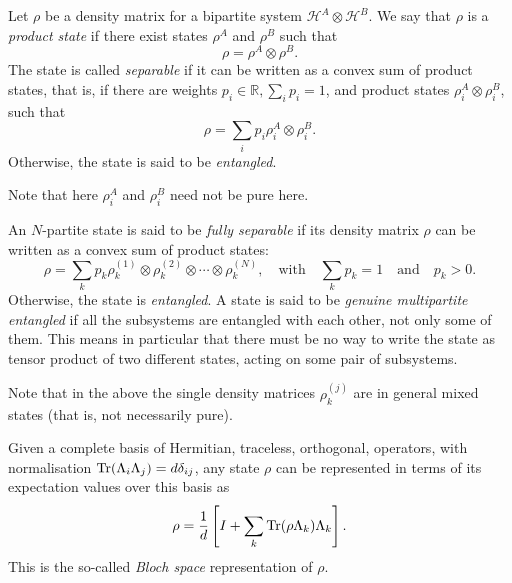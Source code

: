 \documentclass[12pt]{report}
\newcommand{\RR}{\mathbb{R}}
\begin{document}
\begin{defn}
	Let $\rho$ be a density matrix for a bipartite system $\mathcal H^A \otimes \mathcal H^B$.
	We say that $\rho$ is a \emph{product state} if there exist states $\rho^A$ and $\rho^B$ such that
	\begin{equation}
		\rho = \rho^A \otimes \rho^B.
	\end{equation}
	The state is called \emph{separable} if it can be written as a convex sum of product states, that is, if there are weights $p_i\in\RR, \sum_i p_i=1$, and product states $\rho_i^A \otimes \rho_i^B$, such that
	\begin{equation}
		\rho = \sum_i p_i \rho_i^A \otimes \rho_i^B.
	\end{equation}
	Otherwise, the state is said to be \emph{entangled}.
\end{defn}
Note that here $\rho_i^A$ and $\rho_i^B$ need not be pure here.

\begin{defn}
	An $N$-partite state is said to be \emph{fully separable} if its density matrix $\rho$ can be written as a convex sum of product states:
	\begin{equation}
		\rho = \sum_k p_k \rho_k^{(1)} \otimes \rho_k^{(2)} \otimes \cdots \otimes \rho_k^{(N)},
		\quad \text{with} \quad
		\sum_k p_k = 1
		\quad \text{and}\quad
		p_k > 0.
	\end{equation}
	Otherwise, the state is \emph{entangled}.
	A state is said to be \emph{genuine multipartite entangled} if all the subsystems are entangled with each other, not only some of them.
	This means in particular that there must be no way to write the state as tensor product of two different states, acting on some pair of subsystems.
\end{defn}
Note that in the above the single density matrices $\rho_k^{(j)}$ are in general mixed states (that is, not necessarily pure).

\begin{prop}
	Given a complete basis of Hermitian, traceless, orthogonal, operators, with normalisation $\Tr(\Lambda_i\Lambda_j)=d\delta_{ij}$, any state $\rho$ can be represented in terms of its expectation values over this basis as
	\begin{equation}
		\rho = \frac{1}{d}\left[ I + \sum_k \Tr(\rho\Lambda_k)\Lambda_k \right].
	\end{equation}
	This is the so-called \emph{Bloch space} representation of $\rho$.
\end{prop}
\end{document}
